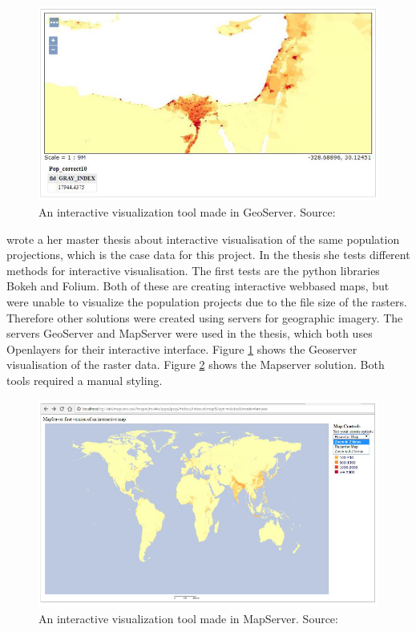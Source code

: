\begin{figure} [H]
	\centering
	\includegraphics[width=.8\textwidth]{Pictures/Geoserver}
	\caption{An interactive visualization tool made in GeoServer. Source: \citet{Sarah}}
	\label{Geoserver}
\end{figure}

\citet{Sarah} wrote a her master thesis about interactive visualisation of the same population projections, which is the case data for this project. In the thesis she tests different methods for interactive visualisation. The first tests are the python libraries Bokeh and Folium. Both of these are creating interactive webbased maps, but were unable to visualize the population projects due to the file size of the rasters. Therefore other solutions were created using servers for geographic imagery. The servers GeoServer and MapServer were used in the thesis, which both uses Openlayers for their interactive interface. Figure \ref{Geoserver} shows the Geoserver visualisation of the raster data. Figure \ref{Mapserver} shows the Mapserver solution. Both tools required a manual styling.

\begin{figure} [H]
	\centering
	\includegraphics[width=.8\textwidth]{Pictures/Mapserver}
	\caption{An interactive visualization tool made in MapServer. Source: \citet{Sarah}}
	\label{Mapserver}
\end{figure}

